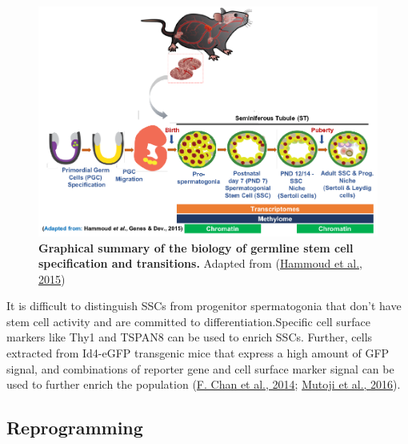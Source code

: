 \documentclass[12pt,twoside]{reedthesis}
\begin{document}
\begin{figure}[h]

{\centering \includegraphics{thesis_files/figure-latex/if2-1} 

}

\caption[Graphical summary of the biology of germline stem cell specification and transitions]{\textbf{Graphical summary of the biology of germline stem cell specification and transitions.} Adapted from (\protect\hyperlink{ref-hammoud2015}{Hammoud et al., 2015})}\label{fig:if2}
\end{figure}
It is difficult to distinguish SSCs from progenitor spermatogonia that
don't have stem cell activity and are committed to
differentiation.Specific cell surface markers like Thy1 and TSPAN8 can
be used to enrich SSCs. Further, cells extracted from Id4-eGFP
transgenic mice that express a high amount of GFP signal, and
combinations of reporter gene and cell surface marker signal can be used
to further enrich the population (\protect\hyperlink{ref-chan2014}{F. Chan et al., 2014}; \protect\hyperlink{ref-mutoji2016}{Mutoji et al., 2016}).

\hypertarget{reprogramming}{%
\subsection*{Reprogramming}\label{reprogramming}}
\end{document}
